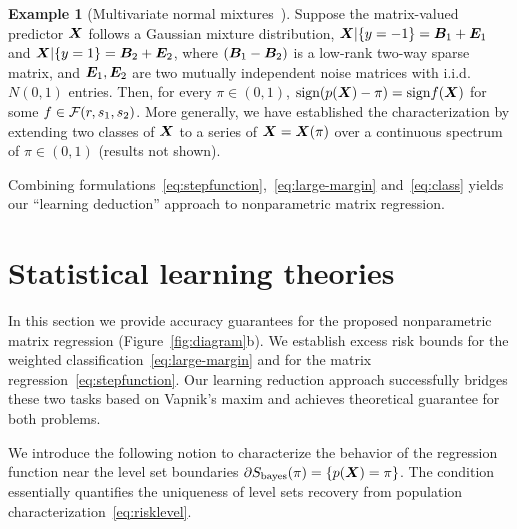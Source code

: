 \documentclass[11pt]{article}
\theoremstyle{definition}
\newtheorem{example}{Example}
\def\sign{\textup{sign}}
\begin{document}
\begin{example}[Multivariate normal mixtures~\citep{hu2020matrix}] Suppose the matrix-valued predictor $\bm X$ follows a Gaussian mixture distribution, $\bm X|\{y=-1\}=\bm B_1+\bm{E}_1$ and $ \bm X|\{y=1\}=\bm B_2+\bm{E}_2$, where $(\bm B_1-\bm B_2)$ is a low-rank two-way sparse matrix, and $\bm{E}_1, \bm{E}_2$ are two mutually independent noise matrices with i.i.d.\ $N(0,1)$ entries. Then, for every $\pi\in(0,1)$, $\sign(p(\mX)-\pi)= \sign f(\mX)$ for some $f\in \mathcal{F}(r,s_1,s_2)$. More generally, we have established the characterization by extending two classes of $\bm X$ to a series of $\bm X=\bm X(\pi)$ over a continuous spectrum of $\pi \in (0,1)$ (results not shown). 

\end{example}

Combining formulations~\eqref{eq:stepfunction},~\eqref{eq:large-margin} and~\eqref{eq:class} yields our ``learning deduction'' approach to nonparametric matrix regression.


\section{Statistical learning theories}\label{sec:theory}
In this section we provide accuracy guarantees for the proposed nonparametric matrix regression (Figure~\ref{fig:diagram}b). We establish excess risk bounds for the weighted classification~\eqref{eq:large-margin} and for the matrix regression~\eqref{eq:stepfunction}. Our learning reduction approach successfully bridges these two tasks based on Vapnik’s maxim and achieves theoretical guarantee for both problems. 

We introduce the following notion to characterize the behavior of the regression function near the level set boundaries $\partial S_{\text{bayes}}(\pi) = \{ p(\bm X)= \pi\}$. The condition essentially quantifies the uniqueness of level sets recovery from population characterization~\eqref{eq:risklevel}.
\end{document}
